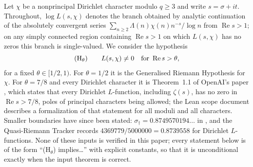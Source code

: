 \documentclass[11pt]{article}
\theoremstyle{definition}
\theoremstyle{remark}
\numberwithin{equation}{section}
\newcommand{\Rea}{\operatorname{Re}}
\begin{document}
Let $\chi$ be a nonprincipal Dirichlet character modulo $q\ge3$ and write $s=\sigma+it$. Throughout, $\log L(s,\chi)$ denotes the branch obtained by analytic continuation of the absolutely convergent series $\sum_{n\ge2}\Lambda(n)\chi(n)n^{-s}/\log n$ from $\Rea s>1$; on any simply connected region containing $\Rea s>1$ on which $L(s,\chi)$ has no zeros this branch is single-valued. We consider the hypothesis
\begin{equation}\label{eq:H}
 \textup{(H$_\theta$)}\qquad L(s,\chi)\ne0\quad\text{for }\Rea s>\theta,
\end{equation}
for a fixed $\theta\in[1/2,1)$. For $\theta=1/2$ it is the Generalised Riemann Hypothesis for $\chi$. For $\theta=7/8$ and every Dirichlet character it is Theorem~1.1 of OpenAI's paper \cite{openai2026q}, which states that every Dirichlet $L$-function, including $\zeta(s)$, has no zero in $\Rea s>7/8$, poles of principal characters being allowed; the Lean scope document \cite{openai2026lean} describes a formalization of that statement for all moduli and all characters. Smaller boundaries have since been stated: $\sigma_\dagger=0.8749570194\ldots$ in \cite{guo2026zf}, and the Quasi-Riemann Tracker \cite{tracker2026} records $4369779/5000000=0.8739558$ for Dirichlet $L$-functions. None of these inputs is verified in this paper; every statement below is of the form ``(H$_\theta$) implies\ldots'' with explicit constants, so that it is unconditional exactly when the input theorem is correct.
\end{document}

